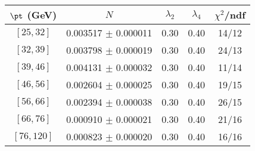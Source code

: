 \begin{tabular}{c||c|c|c|c}
$\pt$ (GeV) & $N$ & $\lambda_{2}$ & $\lambda_4$  & $\chi^2$/ndf  \\
\hline
$[25, 32]$ & 0.003517 $\pm$ 0.000011 & 0.30 & 0.40 & 14/12\\
$[32, 39]$ & 0.003798 $\pm$ 0.000019 & 0.30 & 0.40 & 24/13\\
$[39, 46]$ & 0.004131 $\pm$ 0.000032 & 0.30 & 0.40 & 11/14\\
$[46, 56]$ & 0.002604 $\pm$ 0.000025 & 0.30 & 0.40 & 19/15\\
$[56, 66]$ & 0.002394 $\pm$ 0.000038 & 0.30 & 0.40 & 26/15\\
$[66, 76]$ & 0.000910 $\pm$ 0.000021 & 0.30 & 0.40 & 21/16\\
$[76, 120]$ & 0.000823 $\pm$ 0.000020 & 0.30 & 0.40 & 16/16\\
\end{tabular}
